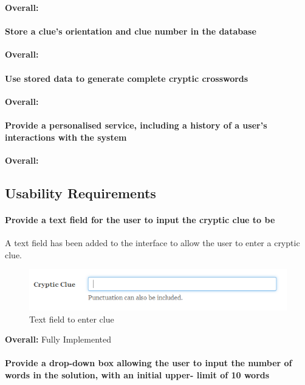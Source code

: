 {\bf Overall:}

\paragraph{Store a clue's orientation and clue number in the
database}

{\bf Overall:}

\paragraph{Use stored data to generate complete cryptic crosswords}

{\bf Overall:}

\paragraph{Provide a personalised service, including a history of a
user's interactions with the system}

{\bf Overall:}

\subsection{Usability Requirements}
\label{sub:test_func_usability}

 \paragraph{Provide a text field for the user to input the cryptic clue to be}
  A text field has been added to the interface to allow the user to enter a cryptic clue. 
\begin{figure}[H]
	\centering
	 \includegraphics[keepaspectratio=true]{evidence/enterclue.png}
	\caption{Text field to enter clue}
\end{figure}

{\bf Overall:} Fully Implemented

 \paragraph{Provide a drop-down box allowing the user to input the
number of words in the solution, with an initial upper-
limit of 10 words}

